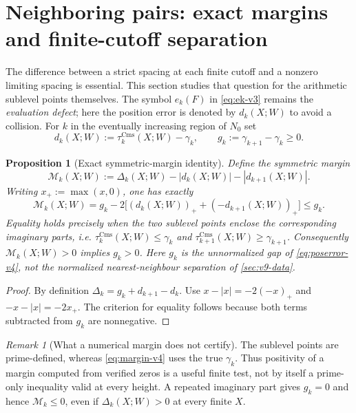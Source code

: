 \documentclass[11pt,a4paper]{article}
\numberwithin{equation}{section}
\newtheorem{proposition}[theorem]{Proposition}
\theoremstyle{definition}
\theoremstyle{remark}
\newtheorem{remark}[theorem]{Remark}
\newcommand{\Cms}{\mathrm{Cms}}
\begin{document}
\section{Neighboring pairs: exact margins and finite-cutoff separation}
\label{sec:near-v4}
The difference between a strict spacing at each finite cutoff and a
nonzero limiting spacing is essential. This section studies that
question for the arithmetic sublevel points themselves. The symbol
$e_k(F)$ in \eqref{eq:ek-v3} remains the \emph{evaluation defect};
here the position error is denoted by $d_k(X;W)$ to avoid a collision.
For $k$ in the eventually increasing region of $N_0$ set
\begin{equation}\label{eq:poserror-v4}
 d_k(X;W):=\tau_k^{\Cms}(X;W)-\gamma_k,\qquad
 g_k:=\gamma_{k+1}-\gamma_k\ge0.
\end{equation}
\begin{proposition}[Exact symmetric-margin identity]
\label{prop:triangle-v4}
Define the symmetric margin
\begin{equation}\label{eq:margin-v4}
 \mathcal M_k(X;W):=\Delta_k(X;W)-|d_k(X;W)|-|d_{k+1}(X;W)|.
\end{equation}
Writing $x_+:=\max(x,0)$, one has exactly
\begin{equation}\label{eq:margin-exact-v4}
 \boxed{\ \mathcal M_k(X;W)
 =g_k-2\bigl[(d_k(X;W))_++(-d_{k+1}(X;W))_+\bigr]\le g_k.\ }
\end{equation}
Equality holds precisely when the two sublevel points enclose the
corresponding imaginary parts, i.e.
$\tau_k^{\Cms}(X;W)\le\gamma_k$ and
$\tau_{k+1}^{\Cms}(X;W)\ge\gamma_{k+1}$.
Consequently $\mathcal M_k(X;W)>0$ implies $g_k>0$.
Here $g_k$ is the unnormalized gap of \eqref{eq:poserror-v4}, not the
normalized nearest-neighbour separation of \cref{sec:v9-data}.
\end{proposition}
\begin{proof}
By definition $\Delta_k=g_k+d_{k+1}-d_k$.
Use $x-|x|=-2(-x)_+$ and $-x-|x|=-2x_+$.
The criterion for equality follows because both terms subtracted
from $g_k$ are nonnegative.
\end{proof}
\begin{remark}[What a numerical margin does not certify]
The sublevel points are prime-defined, whereas \eqref{eq:margin-v4}
uses the true $\gamma_k$. Thus positivity of a margin computed from
verified zeros is a useful finite test, not by itself a prime-only
inequality valid at every height. A repeated imaginary part gives
$g_k=0$ and hence $\mathcal M_k\le0$, even if
$\Delta_k(X;W)>0$ at every finite $X$.
\end{remark}
\end{document}
